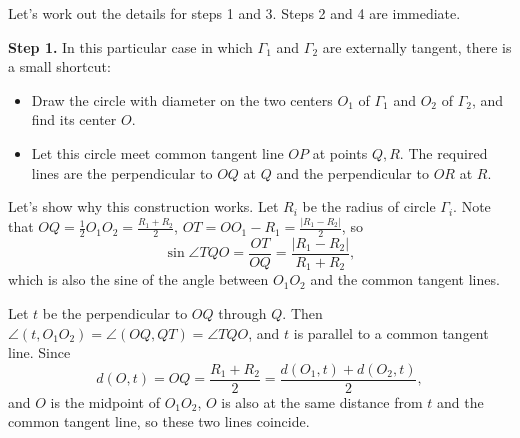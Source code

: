\documentclass[12pt,oneside,a4paper]{book}
\begin{document}
Let's work out the details for steps 1 and 3. Steps 2 and 4 are immediate.

\smallskip
\textbf{Step 1.} In this particular case in which $\Gamma_1$ and $\Gamma_2$ are externally tangent, there is a small shortcut:
\begin{itemize}
\item Draw the circle with diameter on the two centers $O_1$ of $\Gamma_1$ and $O_2$ of $\Gamma_2$, and find its center $O$.
\item Let this circle meet common tangent line $OP$ at points $Q,R$. The required lines are the perpendicular to $OQ$ at $Q$ and the perpendicular to $OR$ at $R$.
\end{itemize}

\begin{center}
\end{center}

Let's show why this construction works. Let $R_i$ be the radius of circle $\Gamma_i$. Note that $OQ = \frac12 O_1O_2 = \frac{R_1+R_2}2$, $OT = OO_1 - R_1 = \frac{|R_1-R_2|}2$, so
\[\sin\angle TQO = \frac{OT}{OQ} = \frac{|R_1-R_2|}{R_1+R_2},\]
which is also the sine of the angle between $O_1O_2$ and the common tangent lines.

Let $t$ be the perpendicular to $OQ$ through $Q$. Then $\angle(t,O_1O_2) = \angle(OQ,QT) = \angle TQO$, and $t$ is parallel to a common tangent line. Since
\[d(O,t) = OQ = \frac{R_1+R_2}2 = \frac{d(O_1,t)+d(O_2,t)}2,\]
and $O$ is the midpoint of $O_1O_2$, $O$ is also at the same distance from $t$ and the common tangent line, so these two lines coincide.
\end{document}
